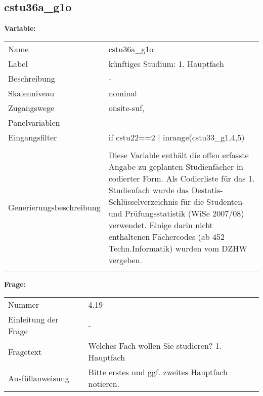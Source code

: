 	
	
	\subsection{cstu36a\_g1o}
	\label{subSection:cstu36a_g1o}

	\noindent\textbf{Variable:}\\
		\begin{tabular}{lL{11.3cm}}
			\label{tableVariable:cstu36a_g1o}
			Name & cstu36a\_g1o \\
			Label & künftiges Studium: 1. Hauptfach \\
			Beschreibung & - \\
			Skalenniveau & nominal \\
			Zugangswege &
				onsite-suf,
 \\
			Panelvariablen & -
			 \\
			Eingangsfilter & if cstu22==2 | inrange(cstu33\_g1,4,5) \\
 \\
					Generierungsbeschreibung & Diese Variable enthält die offen erfasste Angabe zu geplanten Studienfächer in codierter Form.  Als Codierliste für das 1. Studienfach wurde das Destatis-Schlüsselverzeichnis für die Studenten- und Prüfungsstatistik (WiSe 2007/08) verwendet. Einige darin nicht enthaltenen Fächercodes (ab 452 Techn.Informatik) wurden vom DZHW vergeben.
				 \\	
			 \\
		\end{tabular}

		\vspace*{1 cm}
		\noindent\textbf{Frage:}\\
		\begin{tabular}{lL{11.3cm}}
			\label{tableQuestion:cstu36a_g1o}
			Nummer & 4.19 \\
			Einleitung der Frage & - \\
			Fragetext & Welches Fach wollen Sie studieren?
1. Hauptfach \\
			Ausfüllanweisung & Bitte erstes und ggf. zweites Hauptfach notieren. \\
		\end{tabular}






